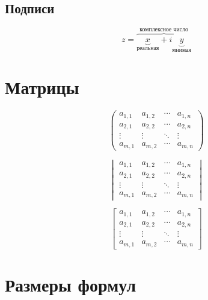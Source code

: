 \documentclass[12pt, a4paper]{article}
\begin{document}
\subsection{Подписи}

\[
 z = \overbrace{
   \underbrace{x}_\text{реальная} + i
   \underbrace{y}_\text{мнимая}
  }^\text{комплексное число}
\]



\section{Матрицы}

\[
 \begin{pmatrix}
  a_{1,1} & a_{1,2} & \cdots & a_{1,n} \\
  a_{2,1} & a_{2,2} & \cdots & a_{2,n} \\
  \vdots  & \vdots  & \ddots & \vdots  \\
  a_{m,1} & a_{m,2} & \cdots & a_{m,n}
 \end{pmatrix}
\]

\[
 \begin{vmatrix}
  a_{1,1} & a_{1,2} & \cdots & a_{1,n} \\
  a_{2,1} & a_{2,2} & \cdots & a_{2,n} \\
  \vdots  & \vdots  & \ddots & \vdots  \\
  a_{m,1} & a_{m,2} & \cdots & a_{m,n}
 \end{vmatrix}
\]

\[
 \begin{bmatrix}
  a_{1,1} & a_{1,2} & \cdots & a_{1,n} \\
  a_{2,1} & a_{2,2} & \cdots & a_{2,n} \\
  \vdots  & \vdots  & \ddots & \vdots  \\
  a_{m,1} & a_{m,2} & \cdots & a_{m,n}
 \end{bmatrix}
\]



\section{Размеры формул}

\end{document}
